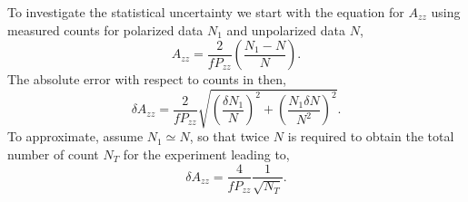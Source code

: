 \label{stat}
To investigate the statistical uncertainty we start with the equation for $A_{zz}$ using
measured counts for polarized data $N_1$ and unpolarized data $N$, 
\begin{equation}
A_{zz}=\frac{2}{fP_{zz}}\left(\frac{N_1-N}{N}\right).
\end{equation}
The absolute error with respect to counts in then,
\begin{equation}
\delta A_{zz}=\frac{2}{fP_{zz}}\sqrt{\left(\frac{\delta N_1}{N}\right)^2+\left(\frac{N_1\delta N}{N^2}\right)^2}.
\end{equation}
To approximate, assume $N_1\simeq N$, so that twice $N$ is required to obtain the total number of count
$N_T$ for the experiment leading to,
\begin{equation}
\delta A_{zz}=\frac{4}{fP_{zz}}\frac{1}{\sqrt{N_T}}.
\end{equation}


